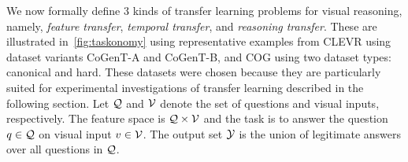 We now formally define 3 kinds of transfer learning problems for visual reasoning, 
namely, \emph{feature transfer}, \emph{temporal transfer}, and \emph{reasoning transfer}.
These are illustrated in~\cref{fig:taskonomy} using representative examples from CLEVR using dataset variants CoGenT-A and CoGenT-B, and COG using two dataset types: canonical and hard. These datasets were chosen because they
are particularly suited for experimental investigations of transfer learning described in the following section.
Let $\mathcal{Q}$ and $\mathcal{V}$ denote the set of questions and visual inputs, respectively.
The feature space is $\mathcal{Q} \times \mathcal{V}$ and the task is to answer
the question $q \in \mathcal{Q}$ on visual input $v \in \mathcal{V}$.
The output set $\mathcal{Y}$ is the union of legitimate answers
over all questions in $\mathcal{Q}$.
